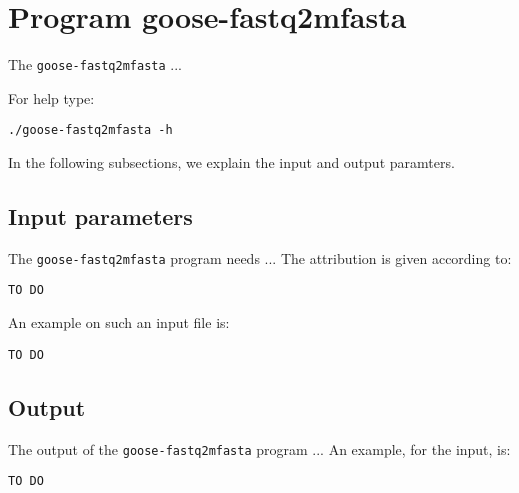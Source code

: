 \section{Program goose-fastq2mfasta}
The \texttt{goose-fastq2mfasta} ...

For help type:
\begin{lstlisting}
./goose-fastq2mfasta -h
\end{lstlisting}
In the following subsections, we explain the input and output paramters.

\subsection{Input parameters}

The \texttt{goose-fastq2mfasta} program needs ...
The attribution is given according to:
\begin{lstlisting}
TO DO
\end{lstlisting}

An example on such an input file is:
\begin{lstlisting}
TO DO
\end{lstlisting}

\subsection{Output}
The output of the \texttt{goose-fastq2mfasta} program ...
An example, for the input, is:
\begin{lstlisting}
TO DO
\end{lstlisting}
